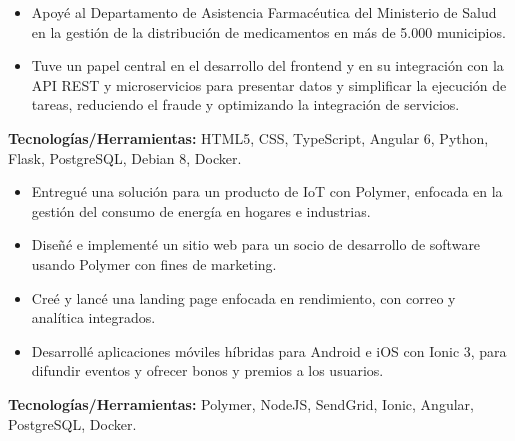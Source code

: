 \documentclass[10pt,a4paper]{altacv}
\begin{document}
\begin{itemize}
    \setlength{\itemindent}{0.5em}
    \item[--] Apoyé al Departamento de Asistencia Farmacéutica del Ministerio de Salud en la gestión de la distribución de medicamentos en más de 5.000 municipios.
    \item[--] Tuve un papel central en el desarrollo del frontend y en su integración con la API REST y microservicios para presentar datos y simplificar la ejecución de tareas, reduciendo el fraude y optimizando la integración de servicios.
\end{itemize}
\textbf{Tecnologías/Herramientas:} HTML5, CSS, TypeScript, Angular 6, Python, Flask, PostgreSQL, Debian 8, Docker.
\vspace{5mm}

\begin{itemize}
    \setlength{\itemindent}{0.5em}
    \item[--] Entregué una solución para un producto de IoT con Polymer, enfocada en la gestión del consumo de energía en hogares e industrias.
    \item[--] Diseñé e implementé un sitio web para un socio de desarrollo de software usando Polymer con fines de marketing.
    \item[--] Creé y lancé una landing page enfocada en rendimiento, con correo y analítica integrados.
    \item[--] Desarrollé aplicaciones móviles híbridas para Android e iOS con Ionic 3, para difundir eventos y ofrecer bonos y premios a los usuarios.
\end{itemize}
\textbf{Tecnologías/Herramientas:} Polymer, NodeJS, SendGrid, Ionic, Angular, PostgreSQL, Docker.
\vspace{5mm}
\end{document}
